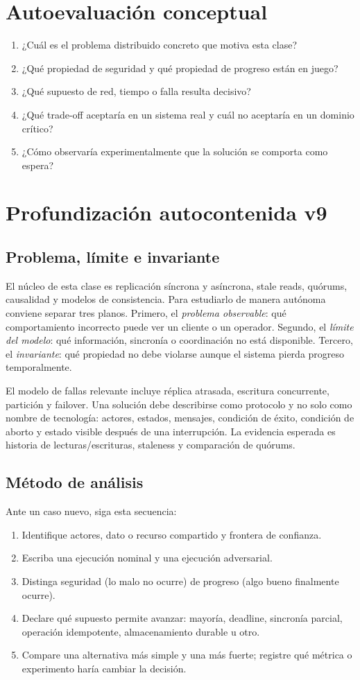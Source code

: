 \documentclass[variant=apuntes,cover=institutional,mode=screen]{ua-engineering-v6-article}
\begin{document}
\section{Autoevaluación conceptual}
\begin{enumerate}
\item ¿Cuál es el problema distribuido concreto que motiva esta clase?
\item ¿Qué propiedad de seguridad y qué propiedad de progreso están en juego?
\item ¿Qué supuesto de red, tiempo o falla resulta decisivo?
\item ¿Qué trade-off aceptaría en un sistema real y cuál no aceptaría en un dominio crítico?
\item ¿Cómo observaría experimentalmente que la solución se comporta como espera?
\end{enumerate}

\section{Profundización autocontenida v9}
\subsection{Problema, límite e invariante}
El núcleo de esta clase es replicación síncrona y asíncrona, stale reads, quórums, causalidad y modelos de consistencia. Para estudiarlo de manera autónoma conviene separar tres planos. Primero, el \emph{problema observable}: qué comportamiento incorrecto puede ver un cliente o un operador. Segundo, el \emph{límite del modelo}: qué información, sincronía o coordinación no está disponible. Tercero, el \emph{invariante}: qué propiedad no debe violarse aunque el sistema pierda progreso temporalmente.

El modelo de fallas relevante incluye réplica atrasada, escritura concurrente, partición y failover. Una solución debe describirse como protocolo y no solo como nombre de tecnología: actores, estados, mensajes, condición de éxito, condición de aborto y estado visible después de una interrupción. La evidencia esperada es historia de lecturas/escrituras, staleness y comparación de quórums.

\subsection{Método de análisis}
Ante un caso nuevo, siga esta secuencia:
\begin{enumerate}
\item Identifique actores, dato o recurso compartido y frontera de confianza.
\item Escriba una ejecución nominal y una ejecución adversarial.
\item Distinga seguridad (lo malo no ocurre) de progreso (algo bueno finalmente ocurre).
\item Declare qué supuesto permite avanzar: mayoría, deadline, sincronía parcial, operación idempotente, almacenamiento durable u otro.
\item Compare una alternativa más simple y una más fuerte; registre qué métrica o experimento haría cambiar la decisión.
\end{enumerate}
\end{document}
